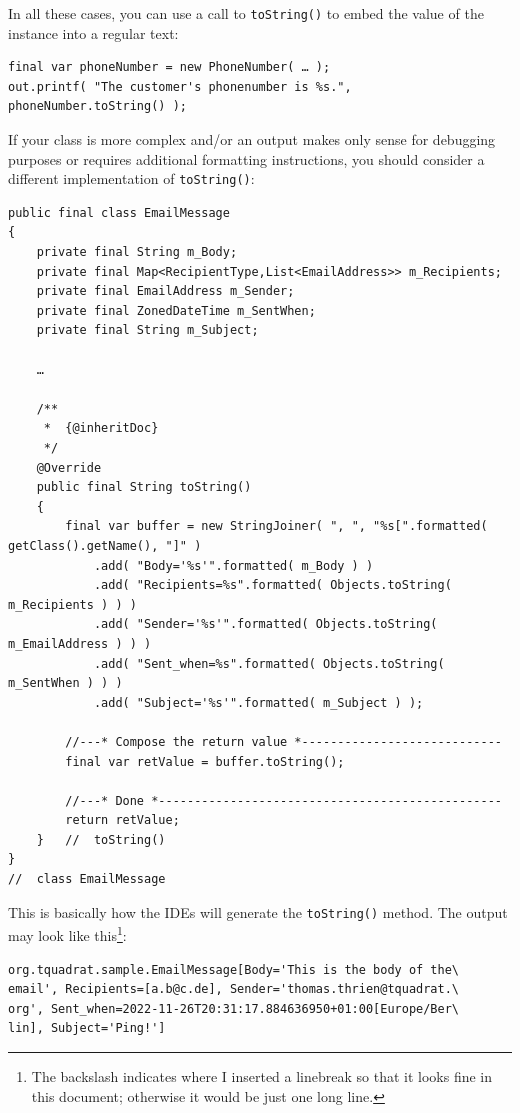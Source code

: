 \documentclass[11pt,a4paper, titlepage, parskip=half, headsepline, footsepline, cleardoublepage=current, headheight=1cm]{scrbook}
\begin{document}
In all these cases, you can use a call to \lstinline|toString()| to embed the value of the instance into a regular text:
\begin{lstlisting}
final var phoneNumber = new PhoneNumber( … );
out.printf( "The customer's phonenumber is %s.", phoneNumber.toString() );
\end{lstlisting}

If your class is more complex and/or an output makes only sense for debugging purposes or requires additional formatting instructions, you should consider a different implementation of \lstinline|toString()|:
\begin{lstlisting}
public final class EmailMessage
{
    private final String m_Body;
    private final Map<RecipientType,List<EmailAddress>> m_Recipients;
    private final EmailAddress m_Sender;
    private final ZonedDateTime m_SentWhen;
    private final String m_Subject;
    
    …
    
    /**
     *  {@inheritDoc}
     */
    @Override 
    public final String toString()
    {
        final var buffer = new StringJoiner( ", ", "%s[".formatted( getClass().getName(), "]" )
            .add( "Body='%s'".formatted( m_Body ) )
            .add( "Recipients=%s".formatted( Objects.toString( m_Recipients ) ) )
            .add( "Sender='%s'".formatted( Objects.toString( m_EmailAddress ) ) )
            .add( "Sent_when=%s".formatted( Objects.toString( m_SentWhen ) ) )
            .add( "Subject='%s'".formatted( m_Subject ) );
            
        //---* Compose the return value *----------------------------    
        final var retValue = buffer.toString();
        
        //---* Done *------------------------------------------------
        return retValue;
    }   //  toString()
}
//  class EmailMessage
\end{lstlisting}

This is basically how the IDEs will generate the \lstinline|toString()| method. The output may look like this\footnote{The backslash indicates where I inserted a linebreak so that it looks fine in this document; otherwise it would be just one long line.}:
\begin{verbatim}
org.tquadrat.sample.EmailMessage[Body='This is the body of the\
email', Recipients=[a.b@c.de], Sender='thomas.thrien@tquadrat.\
org', Sent_when=2022-11-26T20:31:17.884636950+01:00[Europe/Ber\
lin], Subject='Ping!']
\end{verbatim}
\end{document}
